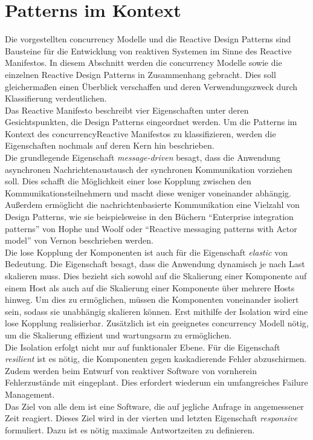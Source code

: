 \section{Patterns im Kontext}

Die vorgestellten \gls{concurrency} Modelle und die Reactive Design Patterns sind Bausteine für die Entwicklung von reaktiven Systemen im Sinne des Reactive Manifestos. In diesem Abschnitt werden die \gls{concurrency} Modelle sowie die einzelnen Reactive Design Patterns in Zusammenhang gebracht. Dies soll gleichermaßen einen Überblick verschaffen und deren Verwendungszweck durch Klassifierung verdeutlichen.\\
Das Reactive Manifesto beschreibt vier Eigenschaften unter deren Gesichtspunkten, die Design Patterns eingeordnet werden. Um die Patterns im Kontext des \gls{concurrency}Reactive Manifestos zu klassifizieren, werden die Eigenschaften nochmals auf deren Kern hin beschrieben.\\

Die grundlegende Eigenschaft \textit{message-driven} besagt, dass die Anwendung asynchronen Nachrichtenaustausch der synchronen Kommunikation vorziehen soll. Dies schafft die Möglichkeit einer lose Kopplung zwischen den Kommunikationsteilnehmern und macht diese weniger voneinander abhängig. Außerdem ermöglicht die nachrichtenbasierte Kommunikation eine Vielzahl von Design Patterns, wie sie beispielsweise in den Büchern \enquote{Enterprise integration patterns} von Hophe und Woolf oder \enquote{Reactive messaging patterns with Actor model} von Vernon beschrieben werden.\\
Die lose Kopplung der Komponenten ist auch für die Eigenschaft \textit{elastic} von Bedeutung. Die Eigenschaft besagt, dass die Anwendung dynamisch je nach Last skalieren muss. Dies bezieht sich sowohl auf die Skalierung einer Komponente auf einem Host als auch auf die Skalierung einer Komponente über mehrere Hosts hinweg. Um dies zu ermöglichen, müssen die Komponenten voneinander isoliert sein, sodass sie unabhängig skalieren können. Erst mithilfe der Isolation wird eine lose Kopplung realisierbar. Zusätzlich ist ein geeignetes \gls{concurrency} Modell nötig, um die Skalierung effizient und wartungsarm zu ermöglichen.\\

Die Isolation erfolgt nicht nur auf funktionaler Ebene. Für die Eigenschaft \textit{resilient} ist es nötig, die Komponenten gegen kaskadierende Fehler abzuschirmen. Zudem werden beim Entwurf von reaktiver Software von vornherein Fehlerzustände mit eingeplant. Dies erfordert wiederum ein umfangreiches Failure Management.\\
Das Ziel von alle dem ist eine Software, die auf jegliche Anfrage in angemessener Zeit reagiert. Dieses Ziel wird in der vierten und letzten Eigenschaft \textit{responsive} formuliert. Dazu ist es nötig maximale Antwortzeiten zu definieren.\\

